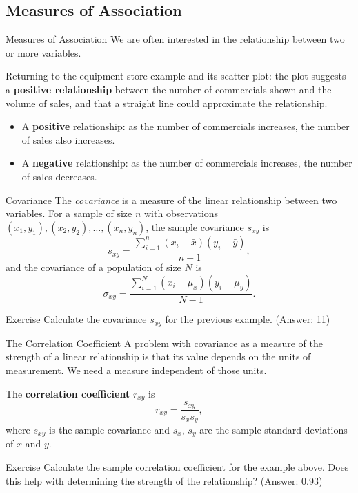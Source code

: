 \documentclass[10pt,aspectratio=169]{beamer}
\begin{document}
\subsection{Measures of Association}

\begin{frame}{Measures of Association}
  We are often interested in the relationship between two or more variables.

  Returning to the equipment store example and its scatter plot: the plot
  suggests a \textbf{positive relationship} between the number of commercials
  shown and the volume of sales, and that a straight line could approximate the
  relationship.

  \begin{itemize}
    \item A \textbf{positive} relationship: as the number of commercials
          increases, the number of sales also increases.
    \item A \textbf{negative} relationship: as the number of commercials
          increases, the number of sales decreases.
  \end{itemize}
\end{frame}

\begin{frame}{Covariance}
  The \emph{covariance} is a measure of the linear relationship between two
  variables. For a sample of size $n$ with observations
  $(x_1, y_1), (x_2, y_2), \ldots, (x_n, y_n)$, the sample covariance $s_{xy}$
  is
  \[
    s_{xy} = \frac{\sum_{i=1}^{n} (x_i - \bar{x})(y_i - \bar{y})}{n-1},
  \]
  and the covariance of a population of size $N$ is
  \[
    \sigma_{xy} = \frac{\sum_{i=1}^{N} (x_i - \mu_x)(y_i - \mu_y)}{N-1}.
  \]

  \begin{alertblock}{Exercise}
    Calculate the covariance $s_{xy}$ for the previous example.
    \hfill (Answer: 11)
  \end{alertblock}
\end{frame}

\begin{frame}{The Correlation Coefficient}
  A problem with covariance as a measure of the strength of a linear
  relationship is that its value depends on the units of measurement. We need a
  measure independent of those units.

  The \textbf{correlation coefficient} $r_{xy}$ is
  \[
    r_{xy} = \frac{s_{xy}}{s_x s_y},
  \]
  where $s_{xy}$ is the sample covariance and $s_x$, $s_y$ are the sample
  standard deviations of $x$ and $y$.

  \begin{alertblock}{Exercise}
    Calculate the sample correlation coefficient for the example above. Does
    this help with determining the strength of the relationship?
    \hfill (Answer: 0.93)
  \end{alertblock}
\end{frame}
\end{document}
